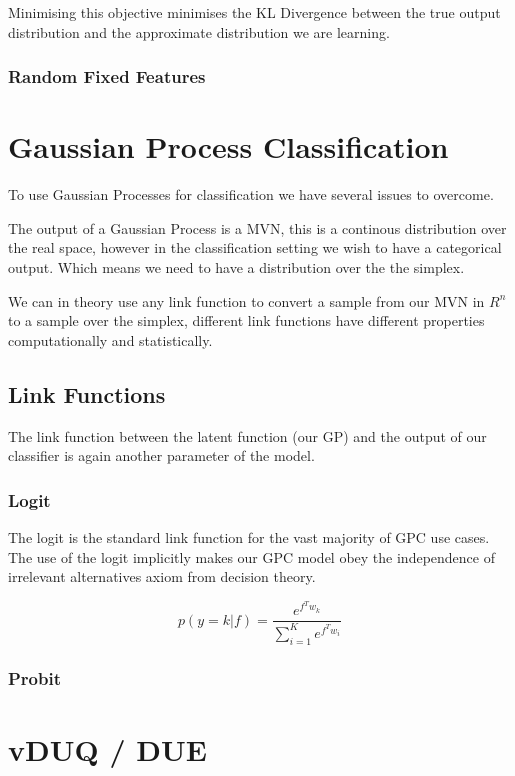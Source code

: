 \documentclass[12pt, a4paper]{report}
\theoremstyle{definition}
\begin{document}
Minimising this objective minimises the KL Divergence between the true output distribution and the approximate distribution we are learning.

\subsubsection{Random Fixed Features}

\section{Gaussian Process Classification}


To use Gaussian Processes for classification we have several issues to overcome.

The output of a Gaussian Process is a MVN, this is a continous distribution over the real space, however in the classification setting we wish to have a categorical output. Which means we need to have a distribution over the the simplex.

We can in theory use any link function to convert a sample from our MVN in $R^n$ to a sample over the simplex, different link functions have different properties computationally and statistically.

\subsection{Link Functions}

The link function between the latent function (our GP) and the output of our classifier is again another parameter of the model.

\subsubsection{Logit}

The logit is the standard link function for the vast majority of GPC use cases. The use of the logit implicitly makes our GPC model obey the independence of irrelevant alternatives axiom from decision theory. 


$$p\left( y = k | f\right) = \frac{e^{f^T w_k}}{\sum_{i=1}^{K} e^{f^T w_i}}$$
\subsubsection{Probit}



\section{vDUQ / DUE}
\end{document}
